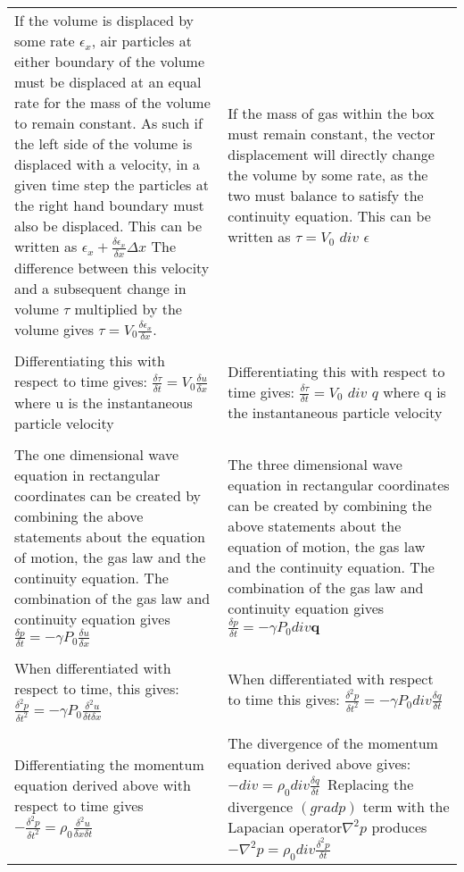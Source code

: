 \begin{center}
\begin{longtable}{|p{}|p{}|}
\\
If the volume is displaced by some rate $\epsilon_x$, air particles at either boundary of the volume must be displaced at an equal rate for the mass of the volume to remain constant. As such if the left side of the volume is displaced with a velocity, in a given time step the particles at the right hand boundary must also be displaced. This can be written as $\epsilon_x + \frac{\delta \epsilon_x}{\delta x} \Delta x$ The difference between this velocity and a subsequent change in volume $\tau$ multiplied by the volume gives $\tau = V_0\frac{\delta \epsilon_x}{\delta x}.$ & If the mass of gas within the box must remain constant, the vector displacement will directly change the volume by some rate, as the two must balance to satisfy the continuity equation. This can be written as $\tau = V_0$ $div$ $\epsilon $ \\
\\
Differentiating this with respect to time gives: $\frac{\delta \tau}{\delta t} = V_0\frac{\delta u}{\delta x}$ where u is the instantaneous particle velocity & Differentiating this with respect to time gives: $\frac{\delta \tau}{\delta t} = V_0$ $div$ $q$ where q is the instantaneous particle velocity\\
\\
The one dimensional wave equation in rectangular coordinates can be created by combining the above statements about the equation of motion, the gas law and the continuity equation. The combination of the gas law and continuity equation gives $\frac{\delta p}{\delta t} = -\gamma P_0\frac{\delta u}{\delta x}$ & The three dimensional wave equation in rectangular coordinates can be created by combining the above statements about the equation of motion, the gas law and the continuity equation. The combination of the gas law and continuity equation gives $\frac{\delta p}{\delta t} = -\gamma P_0 div \textbf{q}$\\
\\
When differentiated with respect to time, this gives: $\frac{\delta^2 p}{\delta t^2} = -\gamma P_0\frac{\delta^2 u}{\delta t \delta x}$ & When differentiated with respect to time this gives: $\frac{\delta^2 p}{\delta t^2} = -\gamma P_0 div \frac{\delta q}{\delta t}$\\
\\
Differentiating the momentum equation derived above with respect to time gives $-\frac{\delta^2 p}{\delta t^2}=\rho_0\frac{\delta^2 u}{\delta x \delta t}$ & The divergence of the momentum equation derived above gives:\ $-div = \rho_0 div \frac{\delta q}{\delta t}$\ Replacing the divergence $(grad p)$ term with the Lapacian operator$\nabla^2 p$ produces\ $-\nabla^2 p = \rho_0 div \frac{\delta^2 p}{\delta t}$\\

\end{longtable}
\end{center}
